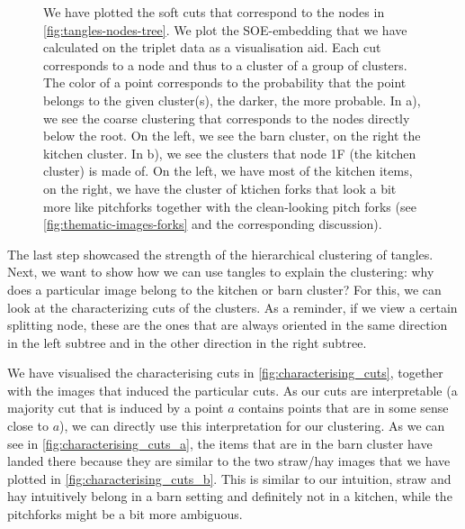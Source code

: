 \onecolumn
\begin{figure}[ht]
    \centering
    \hfill
    \caption{
        We have plotted the soft cuts that correspond to the nodes in \autoref{fig:tangles-nodes-tree}. We plot the SOE-embedding that we
        have calculated on the triplet data as a visualisation aid. Each cut corresponds to a node and thus to a cluster
        of a group of clusters. The color of a point corresponds to the probability that
        the point belongs to the given cluster(s), the darker, the more probable. 
        In a), we see the coarse clustering that corresponds to the nodes directly below the root. On the left, we see the barn cluster, 
        on the right the kitchen cluster. In b), we see the clusters that node 1F (the kitchen cluster) is made of. On the left, we have
        most of the kitchen items, on the right, we have the cluster of ktichen forks that look a bit more like pitchforks together with the clean-looking
        pitch forks (see \autoref{fig:thematic-images-forks} and the corresponding discussion).
    }
    \label{fig:soft-clustering}
\end{figure}

The last step showcased the strength of the hierarchical clustering of tangles. Next, we want to show how we can use tangles to explain the clustering:
why does a particular image belong to the kitchen or barn cluster? For this, we can look at the characterizing cuts of the clusters. As a reminder, if we view a certain splitting node,
these are the ones that are always oriented in the same direction in the left subtree and in the other direction in the right subtree. 

We have visualised the characterising cuts in \autoref{fig:characterising_cuts}, together with the images that induced the particular cuts. As our cuts are interpretable (a majority cut 
that is induced by a point $a$ contains points that are in some sense close to $a$), we can directly use this interpretation for our clustering. As we can see in \autoref{fig:characterising_cuts_a}, 
the items that are in the barn cluster have landed there because they are similar to the two straw/hay images that we have plotted in \autoref{fig:characterising_cuts_b}. This is similar to our intuition, straw and hay intuitively belong 
in a barn setting and definitely not in a kitchen, while the pitchforks might be a bit more ambiguous.

